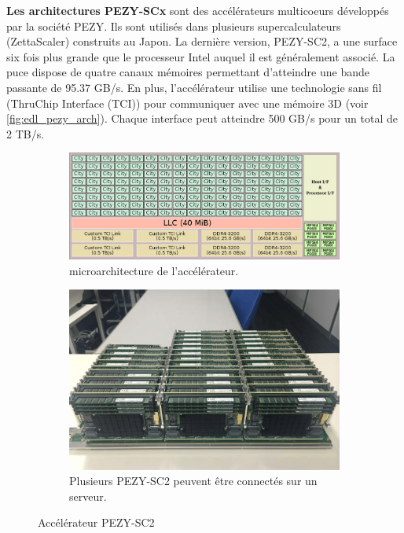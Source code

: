         \textbf{Les architectures PEZY-SCx} sont des accélérateurs multicoeurs développés par la société PEZY.  Ils sont utilisés dans plusieurs supercalculateurs (ZettaScaler) construits au Japon. La dernière version, PEZY-SC2, a une surface six fois plus grande que le processeur Intel auquel il est généralement associé. La puce dispose de quatre canaux mémoires permettant d'atteindre une bande passante de 95.37 GB/s. En plus, l'accélérateur utilise une technologie sans fil (ThruChip Interface (TCI)) pour communiquer avec une mémoire 3D (voir \autoref{fig:edl_pezy_arch}). Chaque interface peut atteindre 500 GB/s pour un total de 2 TB/s. 
          
        \begin{figure}[t!]
            \centering
            \begin{subfigure}[t]{0.48\textwidth}
                \centering
                \includegraphics[width=\linewidth]{images/edl_pezy_arch.png}
                \caption{\label{fig:edl_pezy_arch}microarchitecture de l'accélérateur.}
            \end{subfigure}\hfill
            \begin{subfigure}[t]{0.48\textwidth}
                \centering
                \includegraphics[width=\linewidth]{images/edl_pezzy_board.png}
                \caption{\label{fig:edl_pezzy_board}Plusieurs PEZY-SC2 peuvent être connectés sur un serveur.}
            \end{subfigure}
            \caption{\label{fig:pezy} Accélérateur PEZY-SC2 \cite{RyutaroHimenoToshikazuEbisuzaki2018}}
        \end{figure}
        
